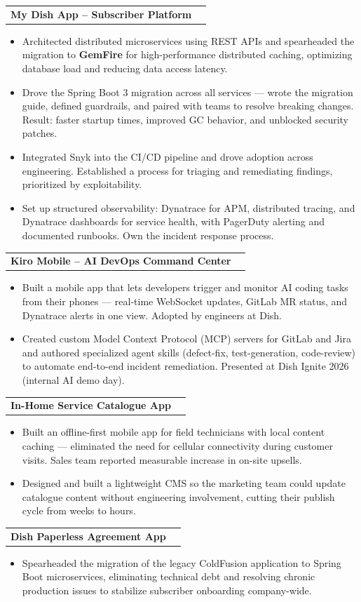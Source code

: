 \documentclass[letterpaper,11pt]{article}
\makeatletter
\newcommand{\resumeItem}[1]{
  \item\small{
    {#1 \vspace{-2pt}}
  }
}
\newcommand{\resumeProjectHeading}[2]{
    \item
    \begin{tabular*}{1.001\textwidth}{l@{\extracolsep{\fill}}r}
      \small#1 & \textbf{\small #2}\\
    \end{tabular*}\vspace{-7pt}
}
\newcommand{\resumeItemListStart}{\begin{itemize}}
\newcommand{\resumeItemListEnd}{\end{itemize}\vspace{-5pt}}
\makeatother
\begin{document}
\vspace{-13pt}
\resumeProjectHeading
    {\textbf{My Dish App -- Subscriber Platform}}{}
\resumeItemListStart
\resumeItem{Architected distributed microservices using REST APIs and spearheaded the migration to \textbf{GemFire} for high-performance distributed caching, optimizing database load and reducing data access latency.}
\resumeItem{Drove the Spring Boot 3 migration across all services --- wrote the migration guide, defined guardrails, and paired with teams to resolve breaking changes. Result: faster startup times, improved GC behavior, and unblocked security patches.}
\resumeItem{Integrated Snyk into the CI/CD pipeline and drove adoption across engineering. Established a process for triaging and remediating findings, prioritized by exploitability.}
\resumeItem{Set up structured observability: Dynatrace for APM, distributed tracing, and Dynatrace dashboards for service health, with PagerDuty alerting and documented runbooks. Own the incident response process.}
\resumeItemListEnd

\vspace{-13pt}
\resumeProjectHeading
     {\textbf{Kiro Mobile -- AI DevOps Command Center}}{}
\resumeItemListStart
 \resumeItem{Built a mobile app that lets developers trigger and monitor AI coding tasks from their phones --- real-time WebSocket updates, GitLab MR status, and Dynatrace alerts in one view. Adopted by engineers at Dish.}
\resumeItem{Created custom Model Context Protocol (MCP) servers for GitLab and Jira and authored specialized agent skills (defect-fix, test-generation, code-review) to automate end-to-end incident remediation. Presented at Dish Ignite 2026 (internal AI demo day).}
\resumeItemListEnd

\vspace{-13pt}
\resumeProjectHeading
    {\textbf{In-Home Service Catalogue App}}{}
\resumeItemListStart
  \resumeItem{Built an offline-first mobile app for field technicians with local content caching --- eliminated the need for cellular connectivity during customer visits. Sales team reported measurable increase in on-site upsells.}
  \resumeItem{Designed and built a lightweight CMS so the marketing team could update catalogue content without engineering involvement, cutting their publish cycle from weeks to hours.}
\resumeItemListEnd

\vspace{-13pt}
\resumeProjectHeading
  {\textbf{Dish Paperless Agreement App}}{}
\resumeItemListStart
\resumeItem{Spearheaded the migration of the legacy ColdFusion application to Spring Boot microservices, eliminating technical debt and resolving chronic production issues to stabilize subscriber onboarding company-wide.}
\resumeItemListEnd
\end{document}

